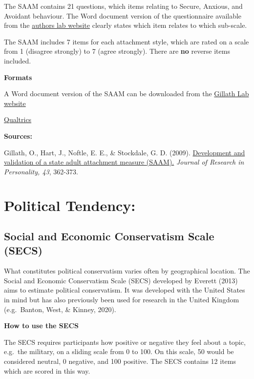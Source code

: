 \documentclass[
]{book}
\begin{document}
The SAAM contains 21 questions, which items relating to Secure, Anxious, and Avoidant behaviour. The Word document version of the questionnaire available from the \href{http://gillab.ku.edu/resources}{authors lab website} clearly states which item relates to which sub-scale.

The SAAM includes 7 items for each attachment style, which are rated on a scale from 1 (disagree strongly) to 7 (agree strongly). There are \textbf{no} reverse items included.

\textbf{Formats}

A Word document version of the SAAM can be downloaded from the \href{http://gillab.ku.edu/resources}{Gillath Lab website}

\href{link\%20to\%20file}{Qualtrics}

\textbf{Sources:}

Gillath, O., Hart, J., Noftle, E. E., \& Stockdale, G. D. (2009). \href{https://www.researchgate.net/profile/Omri_Gillath/publication/223185973_Development_and_validation_of_a_State_Adult_Attachment_Measure_SAAM/links/5a10d5c2458515cc5aa8073c/Development-and-validation-of-a-State-Adult-Attachment-Measure-SAAM.pdf}{Development and validation of a state adult attachment measure (SAAM).} \emph{Journal of Research in Personality, 43}, 362-373.

\hypertarget{political-tendency}{%
\section{Political Tendency:}\label{political-tendency}}

\hypertarget{social-and-economic-conservatism-scale-secs}{%
\subsection{Social and Economic Conservatism Scale (SECS)}\label{social-and-economic-conservatism-scale-secs}}

What constitutes political conservatism varies often by geographical location. The Social and Economic Conservatism Scale (SECS) developed by Everett (2013) aims to estimate political conservatism. It was developed with the United States in mind but has also previously been used for research in the United Kingdom (e.g.~Banton, West, \& Kinney, 2020).

\textbf{How to use the SECS}

The SECS requires participants how positive or negative they feel about a topic, e.g.~the military, on a sliding scale from 0 to 100. On this scale, 50 would be considered neutral, 0 negative, and 100 positive. The SECS contains 12 items which are scored in this way.
\end{document}
